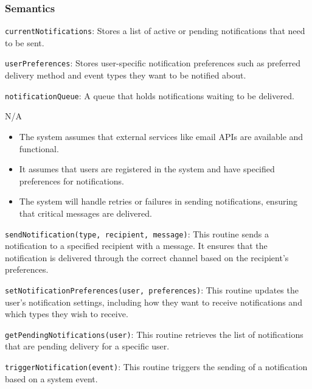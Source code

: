 \documentclass[12pt, titlepage]{article}
\begin{document}
\subsubsection{Semantics}
\begin{description}
  \item[State Variables:]
  \item \texttt{currentNotifications}: Stores a list of active or pending notifications that need 
  to be sent.
  \item \texttt{userPreferences}: Stores user-specific notification preferences such as preferred 
  delivery method and event types they want to be notified about.
  \item \texttt{notificationQueue}: A queue that holds notifications waiting to be delivered.
  \item[Environment Variables:] N/A
  \item[Assumptions:] 
  \item
  \begin{itemize}
    \item The system assumes that external services like email APIs are available and functional.
  \end{itemize}
  \item 
  \begin{itemize}
    \item It assumes that users are registered in the system and have specified preferences for 
    notifications.
  \end{itemize}
  \item 
  \begin{itemize}
    \item The system will handle retries or failures in sending notifications, ensuring that critical 
    messages are delivered.
  \end{itemize}
  \item 

  \item[Access Routine Semantics:]
  \item \texttt{sendNotification(type, recipient, message)}: This routine sends a notification to a 
  specified recipient with a message. It ensures that the notification is delivered through the correct 
  channel based on the recipient's preferences.
  \item \texttt{setNotificationPreferences(user, preferences)}: This routine updates the user's notification 
  settings, including how they want to receive notifications and which types they wish to receive.
  \item \texttt{getPendingNotifications(user)}: This routine retrieves the list of notifications that are 
  pending delivery for a specific user.
  \item \texttt{triggerNotification(event)}: This routine triggers the sending of a notification based on 
  a system event.
  \item 


\end{description}
\end{document}
